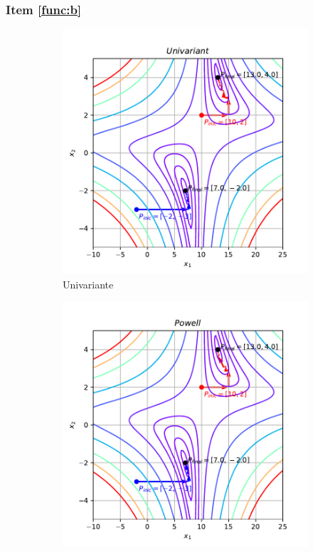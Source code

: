 \documentclass[10pt, a4paper]{article}
\begin{document}
\subsubsection{Item \ref{func:b}}

\begin{figure}[htpb]
  \centering
  \begin{subfigure}[b]{0.32\textwidth}
      \centering
      \includegraphics[width=\textwidth]{images/q1b_Univariant.pdf}
      \caption{Univariante}
      \label{fig:q1b_univariant}
  \end{subfigure}
  \hfill
  \begin{subfigure}[b]{0.32\textwidth}
    \centering
    \includegraphics[width=\textwidth]{images/q1b_Powell.pdf}

\end{subfigure}
\end{figure}
\end{document}
